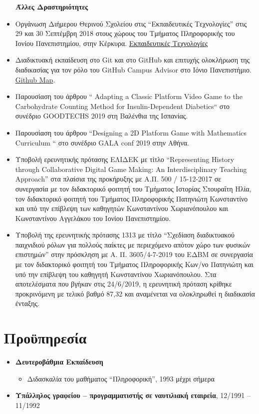 \documentclass[%
    11pt,
  oneside
  ]{memoir}
\let\oldsection\section
\renewcommand{\section}[1]{%
  \oldsection{#1}
  \leavevmode
  \par
  \vspace{\dimexpr-\baselineskip-\parskip}
}
\begin{document}
\begin{itemize}
  \textbf{Άλλες Δραστηριότητες}
\item
  Οργάνωση Διήμερου Θερινού Σχολείου στις ``Εκπαιδευτικές Τεχνολογίες''
  στις 29 και 30 Σεπτέμβρη 2018 στους χώρους του Τμήματος Πληροφορικής
  του Ιονίου Πανεπιστημίου, στην Κέρκυρα.
  \href{https://bgarnb.github.io/Educational-Technologies/}{Εκπαιδευτικές
  Τεχνολογίες}
\item
  Διαδικτυακή εκπαίδευση στο Git και στο GitHub και επιτυχής ολοκλήρωση
  της διαδικασίας για τον ρόλο του GitHub Campus Advisor στο Ιόνιο
  Πανεπιστήμιο.
  \href{https://education.github.com/teachers/advisors}{Github Map}.
\item
  Παρουσίαση του άρθρου `` Adapting a Classic Platform Video Game to the
  Carbohydrate Counting Method for Insulin-Dependent Diabetics`` στο
  συνέδριο GOODTECHS 2019 στη Βαλένθια της Ισπανίας.
\item
  Παρουσίαση του άρθρου ``Designing a 2D Platform Game with Mathematics
  Curriculum `` στο συνέδριο GALA conf 2019 στην Αθήνα.
\item
  Υποβολή ερευνητικής πρότασης ΕΛΙΔΕΚ με τίτλο ``Representing History
  through Collaborative Digital Game Making: An Interdisciplinary
  Teaching Approach'' στα πλαίσια της προκήρυξης με Α.Π. 500 /
  15-12-2017 σε συνεργασία με τον διδακτορικό φοιτητή του Tμήματος
  Ιστορίας Στουραΐτη Ηλία, τον διδακτορικό φοιτητή του Tμήματος
  Πληροφορικής Πατηνιώτη Κωνσταντίνο και υπό την επίβλεψη των καθηγητών
  Κωνσταντίνου Χωριανόπουλου και Κωνσταντίνου Αγγελάκου του Ιονίου
  Πανεπιστημίου.
\item
  Υποβολή της ερευνητικής πρότασης 1313 με τίτλο ``Σχεδίαση διαδικτυακού
  παιχνιδιού ρόλων για πολλούς παίκτες με περιεχόμενο απότον χώρο των
  φυσικών επιστημών'' στην πρόσκληση με Α. Π. 3605/4-7-2019 του ΕΔΒΜ σε
  συνεργασία με τον διδακτορικό φοιτητή του Τμήματος Πληροφορικής Κων/νο
  Πατηνιώτη και υπό την επίβλεψη του καθηγητή Κωνσταντίνου
  Χωριανόπουλου. Στα αποτελέσματα που βγήκαν στις 24/6/2019, η
  ερευνητική πρόταση κρίθηκε προκρινόμενη με τελικό βαθμό 87,32 και
  αναμένεται να ολοκληρωθεί η διαδικασία ένταξης.
\end{itemize}

\hypertarget{ux3c0ux3c1ux3bfux3cbux3c0ux3b7ux3c1ux3b5ux3c3ux3afux3b1}{%
\section{Προϋπηρεσία}\label{ux3c0ux3c1ux3bfux3cbux3c0ux3b7ux3c1ux3b5ux3c3ux3afux3b1}}

\begin{itemize}
\tightlist
\item
  \textbf{Δευτεροβάθμια Εκπαίδευση}

  \begin{itemize}
  \tightlist
  \item
    Διδασκαλία του μαθήματος ``Πληροφορική'', 1993 μέχρι σήμερα
  \end{itemize}
\item
  \textbf{Υπάλληλος γραφείου -- προγραμματιστής σε ναυτιλιακή εταιρεία},
  12/1991 -- 11/1992
\end{itemize}
\end{document}
